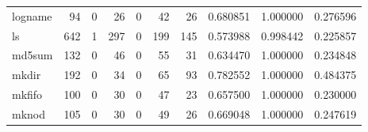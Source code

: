 \begin{tabular}{lrrrrrrrrr}
logname   &                                                 94 &                                                  0 &                                                 26 &                                                  0 &                                                 42 &                                                 26 &                                           0.680851 &                               1.000000 &                             0.276596 \\
ls        &                                                642 &                                                  1 &                                                297 &                                                  0 &                                                199 &                                                145 &                                           0.573988 &                               0.998442 &                             0.225857 \\
md5sum    &                                                132 &                                                  0 &                                                 46 &                                                  0 &                                                 55 &                                                 31 &                                           0.634470 &                               1.000000 &                             0.234848 \\
mkdir     &                                                192 &                                                  0 &                                                 34 &                                                  0 &                                                 65 &                                                 93 &                                           0.782552 &                               1.000000 &                             0.484375 \\
mkfifo    &                                                100 &                                                  0 &                                                 30 &                                                  0 &                                                 47 &                                                 23 &                                           0.657500 &                               1.000000 &                             0.230000 \\
mknod     &                                                105 &                                                  0 &                                                 30 &                                                  0 &                                                 49 &                                                 26 &                                           0.669048 &                               1.000000 &                             0.247619 \\

\end{tabular}
